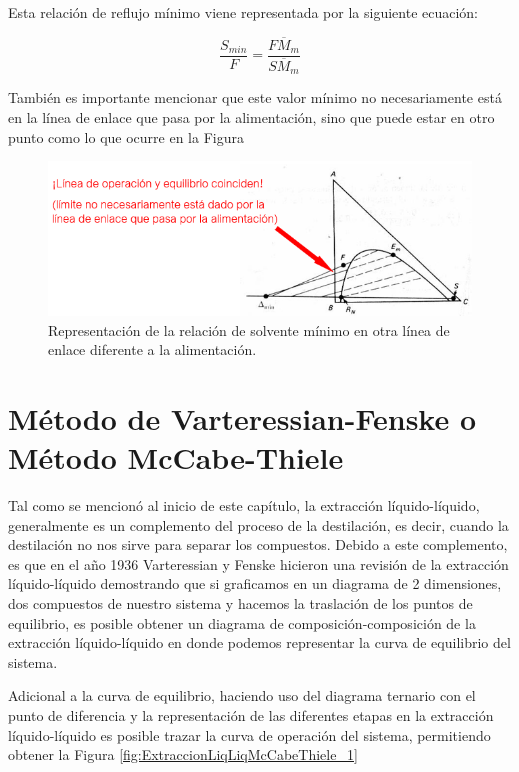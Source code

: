 \documentclass[11pt]{book}
\begin{document}
Esta relación de reflujo mínimo viene representada por la siguiente ecuación:

\begin{equation}
    \label{eq:ExtraccionLiqLiqContracorriente_11}
    \frac{S_{min}}{F} = \frac{\overline{FM_m}}{\overline{SM_m}}
\end{equation}

También es importante mencionar que este valor mínimo no necesariamente está en la línea de enlace que pasa por la alimentación, sino que puede estar en otro punto como lo que ocurre en la Figura 

\begin{figure}[H]
    \centering
    \includegraphics{img/LiquidoLiquido/ExtraccionLiqLiq_ContraCorriente_8.PNG}
    \caption{Representación de la relación de solvente mínimo en otra línea de enlace diferente a la alimentación.}
    \label{fig:ExtraccionLiqLiqContraCorriente_8}
\end{figure}

\section{Método de Varteressian-Fenske o Método McCabe-Thiele}

Tal como se mencionó al inicio de este capítulo, la extracción líquido-líquido, generalmente es un complemento del proceso de la destilación, es decir, cuando la destilación no nos sirve para separar los compuestos. Debido a este complemento, es que en el año 1936 Varteressian y Fenske hicieron una revisión de la extracción líquido-líquido demostrando que si graficamos en un diagrama de 2 dimensiones, dos compuestos de nuestro sistema y hacemos la traslación de los puntos de equilibrio, es posible obtener un diagrama de composición-composición de la extracción líquido-líquido en donde podemos representar la curva de equilibrio del sistema. 

Adicional a la curva de equilibrio, haciendo uso del diagrama ternario con el punto de diferencia y la representación de las diferentes etapas en la extracción líquido-líquido es posible trazar la curva de operación del sistema, permitiendo obtener la Figura \ref{fig:ExtraccionLiqLiqMcCabeThiele_1}
\end{document}

